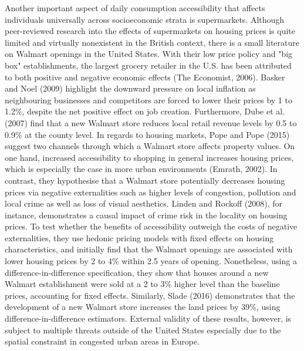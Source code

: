 \documentclass{article}
\begin{document}
Another important aspect of daily consumption accessibility that affects individuals universally across socioeconomic strata is supermarkets. Although peer-reviewed research into the effects of supermarkets on housing prices is quite limited and virtually nonexistent in the British context, there is a small literature on Walmart openings in the United States. With their low price policy and "big box" establishments, the largest grocery retailer in the U.S. has been attributed to both positive and negative economic effects (The Economist, 2006). Basker and Noel (2009) highlight the downward pressure on local inflation as neighbouring businesses and competitors are forced to lower their prices by 1 to 1.2\%, despite the net positive effect on job creation. Furthermore, Dube et al. (2007) find that a new Walmart store reduces local retail revenue levels by 0.5 to 0.9\% at the county level. In regards to housing markets, Pope and Pope (2015) suggest two channels through which a Walmart store affects property values. On one hand, increased accessibility to shopping in general increases housing prices, which is especially the case in more urban environments (Emrath, 2002). In contrast, they hypothesise that a Walmart store potentially decreases housing prices via negative externalities such as higher levels of congestion, pollution and local crime as well as loss of visual aesthetics. Linden and Rockoff (2008), for instance, demonstrates a causal impact of crime risk in the locality on housing prices. To test whether the benefits of accessibility outweigh the costs of negative externalities, they use hedonic pricing models with fixed effects on housing characteristics, and initially find that the Walmart openings are associated with lower housing prices by 2 to 4\% within 2.5 years of opening. Nonetheless, using a difference-in-difference specification, they show that houses around a new Walmart establishment were sold at a 2 to 3\% higher level than the baseline prices, accounting for fixed effects. Similarly, Slade (2016) demonstrates that the development of a new Walmart store increases the land prices by 39\%, using difference-in-difference estimators. External validity of these results, however, is subject to multiple threats outside of the United States especially due to the spatial constraint in congested urban areas in Europe.
\end{document}
